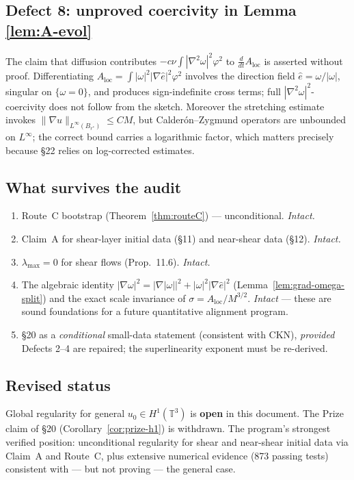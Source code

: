 \documentclass[11pt]{article}
\theoremstyle{definition}
\theoremstyle{remark}
\newcommand{\T}{\mathbb{T}}
\begin{document}
\subsection{Defect 8: unproved coercivity in Lemma \ref{lem:A-evol}}
The claim that diffusion contributes $-c\nu\int|\nabla^2\omega|^2\varphi^2$ to
$\tfrac{d}{dt}A_{\mathrm{loc}}$ is asserted without proof. Differentiating
$A_{\mathrm{loc}} = \int |\omega|^2 |\nabla\hat{e}|^2 \varphi^2$ involves the
direction field $\hat{e} = \omega/|\omega|$, singular on $\{\omega = 0\}$, and
produces sign-indefinite cross terms; full $|\nabla^2\omega|^2$-coercivity does
not follow from the sketch. Moreover the stretching estimate invokes
$\|\nabla u\|_{L^\infty(B_{r^*})} \leq C M$, but Calder\'on--Zygmund operators
are unbounded on $L^\infty$; the correct bound carries a logarithmic factor,
which matters precisely because \S22 relies on log-corrected estimates.

\subsection{What survives the audit}
\begin{enumerate}
  \item Route~C bootstrap (Theorem~\ref{thm:routeC}) --- unconditional. \emph{Intact.}
  \item Claim~A for shear-layer initial data (\S11) and near-shear data (\S12). \emph{Intact.}
  \item $\lambda_{\max} = 0$ for shear flows (Prop.~11.6). \emph{Intact.}
  \item The algebraic identity $|\nabla\omega|^2 = |\nabla|\omega||^2 + |\omega|^2|\nabla\hat{e}|^2$
        (Lemma~\ref{lem:grad-omega-split}) and the exact scale invariance of
        $\sigma = A_{\mathrm{loc}}/M^{3/2}$. \emph{Intact} --- these are sound
        foundations for a future quantitative alignment program.
  \item \S20 as a \emph{conditional} small-data statement (consistent with CKN),
        \emph{provided} Defects 2--4 are repaired; the superlinearity exponent
        must be re-derived.
\end{enumerate}

\subsection{Revised status}
Global regularity for general $u_0 \in H^1(\T^3)$ is \textbf{open} in this
document. The Prize claim of \S20 (Corollary~\ref{cor:prize-h1}) is withdrawn.
The program's strongest verified position: unconditional regularity for shear
and near-shear initial data via Claim~A and Route~C, plus extensive numerical
evidence (873 passing tests) consistent with --- but not proving --- the
general case.
\end{document}
